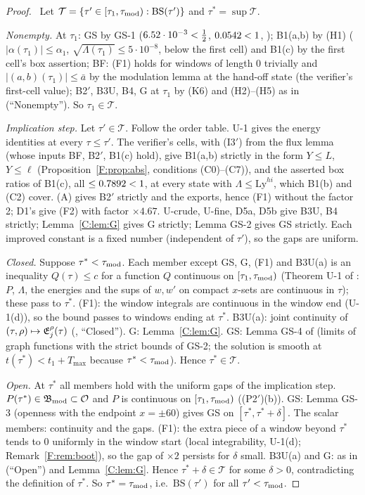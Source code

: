 \documentclass[11pt]{article}
\begin{document}
\begin{proof}\tHd\ Let $\mathcal T=\{\tau'\in[\tau_1,\tau_{\rm mod}):\mathrm{BS}(\tau')\}$ and $\tau^*=\sup\mathcal T$.

\emph{Nonempty.} At $\tau_1$: GS by GS-1 ($6.52\cdot10^{-3}<\frac12$, $0.0542<1$, ); B1(a,b) by (H1) ($|\alpha(\tau_1)|\le\alpha_1$, $\sqrt{\Lambda(\tau_1)}\le5\cdot10^{-8}$, below the first cell) and B1(c) by the first cell's box assertion; BF: (F1) holds for windows of length $0$ trivially and $|(a,b)(\tau_1)|\le\bar a$ by the modulation lemma at the hand-off state (the verifier's first-cell value); B2$'$, B3U, B4, G at $\tau_1$ by (K6) and (H2)--(H5) as in  (``Nonempty''). So $\tau_1\in\mathcal T$.

\emph{Implication step.} Let $\tau'\in\mathcal T$. Follow the order table. U-1 gives the energy identities at every $\tau\le\tau'$. The verifier's cells, with (I3$'$) from the flux lemma (whose inputs BF, B2$'$, B1(c) hold), give B1(a,b) strictly in the form $Y\le L$, $Y\le\ell$ (Proposition~\ref{F:prop:abs}, conditions (C0)--(C7)), and the asserted box ratios of B1(c), all $\le0.7892<1$, at every state with $\Lambda\le\mathrm{Ly}^{hi}$, which B1(b) and (C2) cover. (A) gives B2$'$ strictly and the exports, hence (F1) without the factor 2; D1's  give (F2) with factor $\times4.67$. U-crude, U-fine, D5a, D5b give B3U, B4 strictly; Lemma~\ref{C:lem:G} gives G strictly; Lemma GS-2 gives GS strictly. Each improved constant is a fixed number (independent of $\tau'$), so the gaps are uniform.

\emph{Closed.} Suppose $\tau^*<\tau_{\rm mod}$. Each member except GS, G, (F1) and B3U(a) is an inequality $Q(\tau)\le c$ for a function $Q$ continuous on $[\tau_1,\tau_{\rm mod})$ (Theorem U-1 of : $P$, $\Lambda$, the energies and the sups of $w,w'$ on compact $x$-sets are continuous in $\tau$); these pass to $\tau^*$. (F1): the window integrals are continuous in the window end (U-1(d)), so the bound passes to windows ending at $\tau^*$. B3U(a): joint continuity of $(\tau,\rho)\mapsto\mathfrak E^\rho_j(\tau)$ (, ``Closed''). G: Lemma~\ref{C:lem:G}. GS: Lemma GS-4 of  (limits of graph functions with the strict bounds of GS-2; the solution is smooth at $t(\tau^*)<t_1+T_{\max}$ because $\tau^*<\tau_{\rm mod}$). Hence $\tau^*\in\mathcal T$.

\emph{Open.} At $\tau^*$ all members hold with the uniform gaps of the implication step. $P(\tau^*)\in\mathfrak B_{\rm mod}\subset\mathcal O$ and $P$ is continuous on $[\tau_1,\tau_{\rm mod})$ ((P2$'$)(b)). GS: Lemma GS-3 (openness with the endpoint $x=\pm60$) gives GS on $[\tau^*,\tau^*+\delta]$. The scalar members: continuity and the gaps. (F1): the extra piece of a window beyond $\tau^*$ tends to $0$ uniformly in the window start (local integrability, U-1(d);  Remark~\ref{F:rem:boot}), so the gap of $\times2$ persists for $\delta$ small. B3U(a) and G: as in  (``Open'') and Lemma~\ref{C:lem:G}. Hence $\tau^*+\delta\in\mathcal T$ for some $\delta>0$, contradicting the definition of $\tau^*$. So $\tau^*=\tau_{\rm mod}$, i.e.\ $\mathrm{BS}(\tau')$ for all $\tau'<\tau_{\rm mod}$.


\end{proof}
\end{document}
